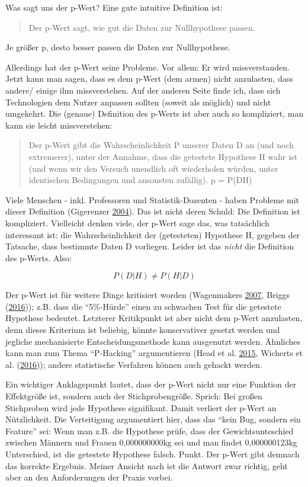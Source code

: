 \documentclass[12pt,]{book}
\begin{document}
Was sagt uns der p-Wert? Eine gute intuitive Definition ist:

\begin{quote}
Der p-Wert sagt, wie gut die Daten zur Nullhypothese passen.
\end{quote}

Je größer p, desto besser passen die Daten zur Nullhypothese.

Allerdings hat der p-Wert seine Probleme. Vor allem: Er wird
missverstanden. Jetzt kann man sagen, dass es dem p-Wert (dem armen)
nicht anzulasten, dass andere/ einige ihm missverstehen. Auf der anderen
Seite finde ich, dass sich Technologien dem Nutzer anpassen sollten
(soweit als möglich) und nicht umgekehrt. Die (genaue) Definition des
p-Werts ist aber auch so kompliziert, man kann sie leicht missverstehen:

\begin{quote}
Der p-Wert gibt die Wahrscheinlichkeit P unserer Daten D an (und noch
extremerer), unter der Annahme, dass die getestete Hypothese H wahr ist
(und wenn wir den Versuch unendlich oft wiederholen würden, unter
identischen Bedingungen und ansonsten zufällig). p = P(D\textbar{}H)
\end{quote}

Viele Menschen - inkl. Professoren und Statistik-Dozenten - haben
Probleme mit dieser Definition (Gigerenzer
\protect\hyperlink{ref-Gigerenzer2004}{2004}). Das ist nicht deren
Schuld: Die Definition ist kompliziert. Vielleicht denken viele, der
p-Wert sage das, was tatsächlich interessant ist: die Wahrscheinlichkeit
der (getesteten) Hypothese H, gegeben der Tatsache, dass bestimmte Daten
D vorliegen. Leider ist das \emph{nicht} die Definition des p-Werts.
Also:

\[ P(D|H) \ne P(H|D) \]

Der p-Wert ist für weitere Dinge kritisiert worden (Wagenmakers
\protect\hyperlink{ref-Wagenmakers2007}{2007}, Briggs
(\protect\hyperlink{ref-uncertainty}{2016})); z.B. dass die
``5\%-Hürde'' einen zu schwachen Test für die getestete Hypothese
bedeutet. Letzterer Kritikpunkt ist aber nicht dem p-Wert anzulasten,
denn dieses Kriterium ist beliebig, könnte konservativer gesetzt werden
und jegliche mechanisierte Entscheidungsmethode kann ausgenutzt werden.
Ähnliches kann man zum Thema ``P-Hacking'' argumentieren (Head et al.
\protect\hyperlink{ref-Head2015}{2015}, Wicherts et al.
(\protect\hyperlink{ref-Wicherts2016}{2016})); andere statistische
Verfahren können auch gehackt werden.

Ein wichtiger Anklagepunkt lautet, dass der p-Wert nicht nur eine
Funktion der Effektgröße ist, sondern auch der Stichprobengröße. Sprich:
Bei großen Stichproben wird jede Hypothese signifikant. Damit verliert
der p-Wert an Nützlichkeit. Die Verteitigung argumentiert hier, dass das
``kein Bug, sondern ein Feature'' sei: Wenn man z.B. die Hypothese
prüfe, dass der Gewichtsunteschied zwischen Männern und Frauen
0,000000000kg sei und man findet 0,000000123kg Unterschied, ist die
getestete Hypothese falsch. Punkt. Der p-Wert gibt demnach das korrekte
Ergebnis. Meiner Ansicht nach ist die Antwort zwar richtig, geht aber an
den Anforderungen der Praxis vorbei.
\end{document}
